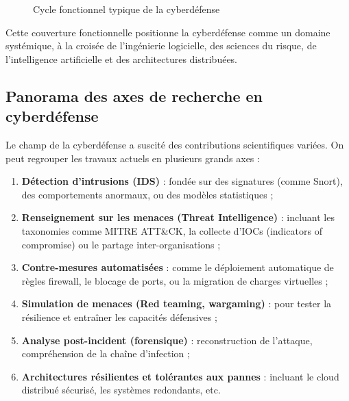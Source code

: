 \documentclass[ twoside,openright,titlepage,numbers=noenddot,headinclude,%
                footinclude=true,cleardoublepage=empty,abstractoff, %
                BCOR=5mm,paper=a4,fontsize=11pt,%
                french,american,%
                ]{scrreprt}
\begin{document}
\begin{figure}[H]
    \centering
    \caption{Cycle fonctionnel typique de la cyberdéfense}
    \label{fig:cycle-cyberdef}
\end{figure}

Cette couverture fonctionnelle positionne la cyberdéfense comme un domaine systémique, à la croisée de l’ingénierie logicielle, des sciences du risque, de l’intelligence artificielle et des architectures distribuées.

\vspace{0.5em}
\subsection*{Panorama des axes de recherche en cyberdéfense}

Le champ de la cyberdéfense a suscité des contributions scientifiques variées. On peut regrouper les travaux actuels en plusieurs grands axes :

\begin{enumerate}
    \item \textbf{Détection d’intrusions (IDS)} : fondée sur des signatures (comme Snort), des comportements anormaux, ou des modèles statistiques ;
    \item \textbf{Renseignement sur les menaces (Threat Intelligence)} : incluant les taxonomies comme MITRE ATT\&CK, la collecte d’IOCs (indicators of compromise) ou le partage inter-organisations ;
    \item \textbf{Contre-mesures automatisées} : comme le déploiement automatique de règles firewall, le blocage de ports, ou la migration de charges virtuelles ;
    \item \textbf{Simulation de menaces (Red teaming, wargaming)} : pour tester la résilience et entraîner les capacités défensives ;
    \item \textbf{Analyse post-incident (forensique)} : reconstruction de l’attaque, compréhension de la chaîne d’infection ;
    \item \textbf{Architectures résilientes et tolérantes aux pannes} : incluant le cloud distribué sécurisé, les systèmes redondants, etc.
\end{enumerate}
\end{document}

